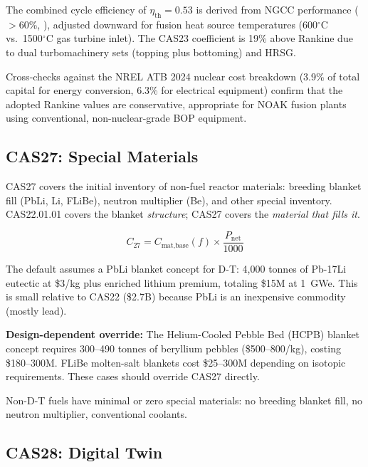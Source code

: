 \documentclass{article}
\begin{document}
The combined cycle efficiency of $\eta_{\text{th}} = 0.53$ is derived from
NGCC performance ($>$60\%, \citealt{netl2022}), adjusted downward for fusion
heat source temperatures (600$^\circ$C vs.\ 1500$^\circ$C gas
turbine inlet).  The CAS23 coefficient is 19\% above Rankine due to dual
turbomachinery sets (topping plus bottoming) and HRSG.

Cross-checks against the NREL ATB 2024 nuclear cost breakdown (3.9\% of
total capital for energy conversion, 6.3\% for electrical equipment) confirm
that the adopted Rankine values are conservative, appropriate for NOAK fusion plants
using conventional, non-nuclear-grade BOP equipment.


\subsection{CAS27: Special Materials}
\label{sec:cas27}

CAS27 covers the initial inventory of non-fuel reactor materials:
breeding blanket fill (PbLi, Li, FLiBe), neutron multiplier (Be), and
other special inventory.  CAS22.01.01 covers the blanket \textit{structure};
CAS27 covers the \textit{material that fills it}.

\begin{equation}
\label{eq:cas27}
C_{27} = C_{\text{mat,base}}(f) \times \frac{P_{\text{net}}}{1000}
\end{equation}

The default assumes a PbLi blanket concept for D-T: 4{,}000 tonnes
of Pb-17Li eutectic at \$3/kg plus enriched lithium premium,
totaling \$15M at 1~GWe.  This is small relative to CAS22
(\$2.7B) because PbLi is an inexpensive commodity (mostly lead).

\textbf{Design-dependent override:} The Helium-Cooled Pebble Bed (HCPB)
blanket concept requires 300--490 tonnes of beryllium pebbles
(\$500--800/kg), costing \$180--300M.  FLiBe molten-salt blankets
cost \$25--300M depending on isotopic requirements.  These cases should
override CAS27 directly.

Non-D-T fuels have minimal or zero special materials: no breeding
blanket fill, no neutron multiplier, conventional coolants.


\subsection{CAS28: Digital Twin}
\label{sec:cas28}
\end{document}
